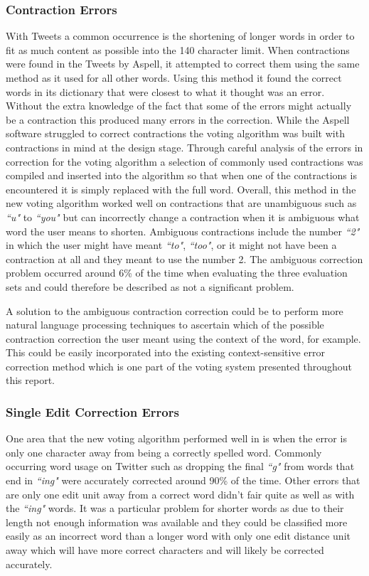 \subsubsection*{Contraction Errors}
With Tweets a common occurrence is the shortening of longer words in order to fit as much content as possible into the 140 character limit. When contractions were found in the Tweets by Aspell, it attempted to correct them using the same method as it used for all other words. Using this method it found the correct words in its dictionary that were closest to what it thought was an error. Without the extra knowledge of the fact that some of the errors might actually be a contraction this produced many errors in the correction. While the Aspell software struggled to correct contractions the voting algorithm was built with contractions in mind at the design stage. Through careful analysis of the errors in correction for the voting algorithm a selection of commonly used contractions was compiled and inserted into the algorithm so that when one of the contractions is encountered it is simply replaced with the full word. Overall, this method in the new voting algorithm worked well on contractions that are unambiguous such as \emph{``u"} to \emph{``you"} but can incorrectly change a contraction when it is ambiguous what word the user means to shorten. Ambiguous contractions include the number \emph{``2"} in which the user might have meant \emph{``to"}, \emph{``too"}, or it might not have been a contraction at all and they meant to use the number 2. The ambiguous correction problem occurred around 6\% of the time when evaluating the three evaluation sets and could therefore be described as not a significant problem.

A solution to the ambiguous contraction correction could be to perform more natural language processing techniques to ascertain which of the possible contraction correction the user meant using the context of the word, for example. This could be easily incorporated into the existing context-sensitive error correction method which is one part of the voting system presented throughout this report.

\subsubsection*{Single Edit Correction Errors}
One area that the new voting algorithm performed well in is when the error is only one character away from being a correctly spelled word. Commonly occurring word usage on Twitter such as dropping the final \emph{``g"} from words that end in \emph{``ing"} were accurately corrected around 90\% of the time. Other errors that are only one edit unit away from a correct word didn't fair quite as well as with the \emph{``ing"} words. It was a particular problem for shorter words as due to their length not enough information was available and they could be classified more easily as an incorrect word than a longer word with only one edit distance unit away which will have more correct characters and will likely be corrected accurately.

